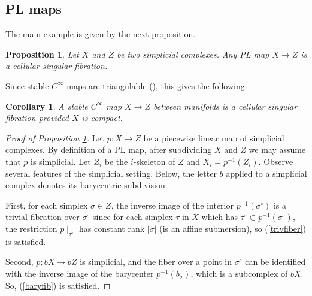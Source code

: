 \documentclass[11pt,letterpaper]{amsart}
\newtheorem{corollary}[theorem]{Corollary}
\newtheorem{proposition}[theorem]{Proposition}
\begin{document}
\subsection{PL maps}
The main example is given by the next proposition. 
\begin{proposition}
\label{PLmap}
Let $X$ and $Z$ be two simplicial complexes. Any PL map $X\rightarrow Z$ is a cellular singular fibration. 
\end{proposition}
Since stable $C^{\infty}$ maps are triangulable (\cite{verona}), this gives the following.%
\begin{corollary}
A stable $C^{\infty}$ map $X\rightarrow Z$ between manifolds is a cellular singular fibration provided $X$ is compact. 
\end{corollary}
\begin{proof}[Proof of Proposition \ref{PLmap}]



Let $p:X\rightarrow Z$ be a piecewise linear map of simplicial complexes. By definition of a PL map, after subdividing $X$ and $Z$ we may assume that $p$ is simplicial. Let $Z_i$ be the $i$-skeleton of $Z$ and $X_i=p^{-1}(Z_i)$. Observe several features of the simplicial setting. Below, the letter $b$ applied to a simplicial complex denotes its barycentric subdivision.

First, for each simplex $\sigma \in Z$, the inverse image of the interior $p^{-1}(\sigma^{\circ})$ is a trivial fibration over $\sigma^\circ$ since for each simplex $\tau$ in $X$ which has $\tau^{\circ}\subset p^{-1}(\sigma^{\circ})$, the restriction $p\mid_{\tau^{\circ}}$ has constant rank $|\sigma|$ (is an affine submersion), so (\ref{trivfiber}) is satisfied. 

Second, $p:bX\rightarrow bZ$ is simplicial, and the fiber over a point in $\sigma^{\circ}$ can be identified with the inverse image of the barycenter $p^{-1}(b_{\sigma})$, which is a subcomplex of $bX$. So, (\ref{baryfib}) is satisfied.




\end{proof}
\end{document}
